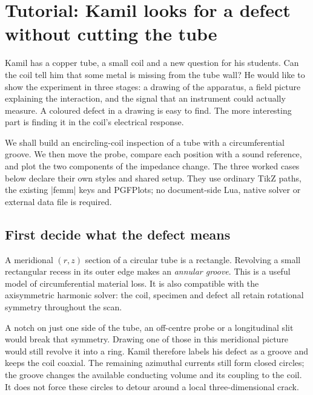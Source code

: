 \clearpage
\section{Tutorial: Kamil looks for a defect without cutting the tube}
\label{sec:tutorial-ndt}

Kamil has a copper tube, a small coil and a new question for his students.
Can the coil tell him that some metal is missing from the tube wall? He would
like to show the experiment in three stages: a drawing of the apparatus,
a field picture explaining the interaction, and the signal that an instrument
could actually measure. A coloured defect in a drawing is easy to find.
The more interesting part is finding it in the coil's electrical response.

We shall build an encircling-coil inspection of a tube with a circumferential
groove. We then move the probe, compare each position with a sound reference,
and plot the two components of the impedance change. The three worked cases
below declare their own styles and shared setup. They use ordinary
TikZ paths, the existing |femm| keys and PGFPlots; no document-side Lua,
native solver or external data file is required.

\subsection{First decide what the defect means}
A meridional $(r,z)$ section of a circular tube is a rectangle. Revolving a
small rectangular recess in its outer edge makes an \emph{annular groove}.
This is a useful model of circumferential material loss. It is also compatible
with the axisymmetric harmonic solver: the coil, specimen and defect all
retain rotational symmetry throughout the scan.

A notch on just one side of the tube, an off-centre probe or a longitudinal
slit would break that symmetry. Drawing one of those in this meridional
picture would still revolve it into a ring. Kamil therefore labels his defect
as a groove and keeps the coil coaxial. The remaining azimuthal currents still
form closed circles; the groove changes the available conducting volume and
its coupling to the coil. It does not force these circles to detour around a
local three-dimensional crack.

